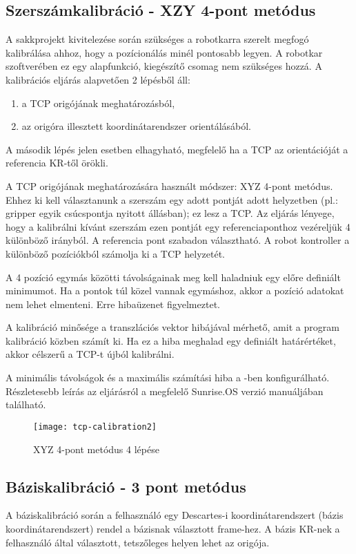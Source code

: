 \documentclass[../documentation.tex]{subfiles}
\begin{document}
\newpage
\subsection{Szerszámkalibráció - XZY 4-pont metódus}
A sakkprojekt kivitelezése során szükséges a robotkarra szerelt megfogó kalibrálása ahhoz, hogy a pozícionálás minél pontosabb legyen. A robotkar szoftverében ez egy alapfunkció, kiegészítő csomag nem szükséges hozzá. A kalibrációs eljárás alapvetően 2 lépésből áll:
\begin{enumerate}
	\item a TCP origójának meghatározásból,
	\item az origóra illesztett koordinátarendszer orientálásából.
\end{enumerate}
A második lépés jelen esetben elhagyható, megfelelő ha a TCP az orientációját a referencia KR-től örökli. 

A TCP origójának meghatározására használt módszer: XYZ 4-pont metódus. Ehhez ki kell választanunk a szerszám egy adott pontját adott helyzetben (pl.: gripper egyik csúcspontja nyitott állásban); ez lesz a TCP. Az eljárás lényege, hogy a kalibrálni kívánt szerszám ezen pontját egy referenciaponthoz vezéreljük 4 különböző irányból. A referencia pont szabadon választható. A robot kontroller a különböző  pozíciókból számolja ki a TCP helyzetét.

A 4  pozíció egymás közötti távolságainak meg kell haladniuk egy előre definiált minimumot. Ha a pontok túl közel vannak egymáshoz, akkor a pozíció adatokat nem lehet elmenteni. Erre hibaüzenet figyelmeztet.

A kalibráció minősége a transzlációs vektor hibájával mérhető, amit a program kalibráció közben számít ki. Ha ez a hiba meghalad egy definiált határértéket, akkor célszerű a TCP-t újból kalibrálni.

A minimális távolságok és a maximális számítási hiba a -ben konfigurálható. Részletesebb leírás az eljárásról a megfelelő Sunrise.OS verzió manuáljában található\cite{sunrisemanual}.

\begin{figure}[h]
	\centering
	\texttt{[image: tcp-calibration2]}
	\caption{XYZ 4-pont metódus 4 lépése\cite{sunrisemanual}}
	\label{fig:tcp-examples}
\end{figure}

\subsection{Báziskalibráció - 3 pont metódus}
A báziskalibráció során a felhasználó egy Descartes-i koordinátarendszert (bázis koordinátarendszert) rendel a bázisnak választott frame-hez. A bázis KR-nek a felhasználó által választott, tetszőleges helyen lehet az origója.
\end{document}
